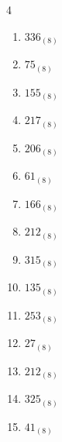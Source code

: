 \begin{multicols}{4}
\begin{enumerate}
  \item $336_{(8)}$

        \phantom{$=222$}

  \item $75_{(8)}$

        \phantom{$=61$}

  \item $155_{(8)}$

        \phantom{$=109$}

  \item $217_{(8)}$

        \phantom{$=143$}

  \item $206_{(8)}$

        \phantom{$=134$}

  \item $61_{(8)}$

        \phantom{$=49$}

  \item $166_{(8)}$

        \phantom{$=118$}

  \item $212_{(8)}$

        \phantom{$=138$}

  \item $315_{(8)}$

        \phantom{$=205$}

  \item $135_{(8)}$

        \phantom{$=93$}

  \item $253_{(8)}$

        \phantom{$=171$}

  \item $27_{(8)}$

        \phantom{$=23$}

\columnbreak %

\resetques

  \item $212_{(8)}$

        \phantom{$=138$}

  \item $325_{(8)}$

        \phantom{$=213$}

  \item $41_{(8)}$

        \phantom{$=33$}


\end{enumerate}
\end{multicols}

